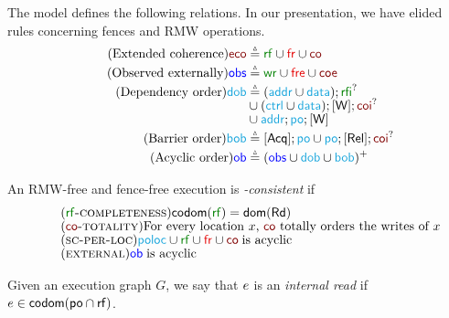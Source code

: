 The \armeight{} model defines the following relations.
In our presentation, we have elided rules concerning fences and RMW operations.
\begin{align*}
  \tag{Extended coherence}
  {\reco} &\eqdef {\rrf} \cup {\rfr} \cup {\rco}
  \\
  \tag{Observed externally}
  {\robs} &\eqdef \smash{
    {\rrfe} \cup {\rfre} \cup {\rcoe}
  }
  \\
  \tag{Dependency order}
  {\rdob} &\eqdef \smash{({\raddr}\cup{\rdata}); {\rrfi}^?}
  \\[-1ex]
  &\cup \smash{({\rctrl}\cup{\rdata}); {\IDW}; {\rcoi}^?}
  \\[-1ex]
  &\cup \smash{{\raddr}; {\rpox}; {\IDW}}
  \\
  \tag{Barrier order}
  {\rbob} &\eqdef\smash{
    {\IDAcq}; {\rpox}
    \cup {\rpox};{\IDRel}; {\rcoi}^?
  }
  \\
  \tag{Acyclic order}
  {\rob} &\eqdef\smash{
    ({\robs} \cup {\rdob} \cup {\rbob})^+
  }
\end{align*}
\begin{definition}
  An RMW-free and fence-free execution is \emph{\armeight{}-consistent} if
  \begin{align*}&
    \tag{\textsc{$\rrfx$-completeness}}\label{rf-comp}
    \fcodom(\rrfx)=\fdom(\rreads)
    \\[-1ex]&
    \tag{\textsc{$\rco$-totality}}\label{co-tot}
    \text{For every location $\aLoc$, $\rco$ totally orders the writes of $\aLoc$}  
    \\[-1ex]&
    \tag{\textsc{sc-per-loc}}\label{sc-per-loc}
    {\rpoloc} \cup {\rrfx} \cup {\rfr} \cup {\rco}\;\text{is acyclic}
    \\[-1ex]&
    \tag{\textsc{external}}\label{external}
    {\rob}\;\text{is acyclic}
  \end{align*}
\end{definition}


Given an execution graph $G$, we say that $e$ is an \emph{internal read} if
$e\in\mathsf{codom}(\mathsf{po}\cap \mathsf{rf})$.    


